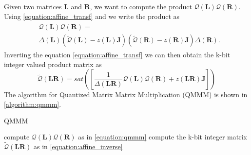  Given two matrices $\mathbf{L}$ and $\mathbf{R}$, we want to compute the product $\mathcal{Q}(\mathbf{L}) \mathcal{Q}(\mathbf{R})$. Using \cref{equation:affine_transf} and we write the product as 
\begin{align}\label{equation:qmmm}
\begin{split}
& \mathcal{Q}(\mathbf{L}) \mathcal{Q}(\mathbf{R}) =\\
 & \Delta (\mathbf{L})\left( \tilde{\mathcal{Q}}(\mathbf{L}) - z(\mathbf{L})\mathbf{J} \right)
\left( \tilde{\mathcal{Q}}(\mathbf{R}) - z(\mathbf{R})\mathbf{J} \right)  \Delta (\mathbf{R}).
\end{split}
\end{align}
Inverting the equation \ref{equation:affine_transf}  we can then obtain the k-bit integer valued product matrix as 
\begin{equation}\label{equation:affine_inverse}
\tilde{\mathcal{Q}}(\mathbf{LR}) = sat([\frac{1}{\Delta(\mathbf{LR})}\mathcal{Q}(\mathbf{L}) \mathcal{Q}(\mathbf{R}) + z(\mathbf{LR}) \mathbf{J}])
\end{equation} The algorithm for Quantized Matrix Matrix Multiplication (QMMM) is shown in \cref{algorithm:qmmm}.

\begin{algorithm}
	\caption{QMMM}\label{algorithm:qmmm}
	\begin{algorithmic}[1]
		\State compute $\mathcal{Q}(\mathbf{L}) \mathcal{Q}(\mathbf{R})$ as in \cref{equation:qmmm}
		\State compute the k-bit integer matrix $\tilde{\mathcal{Q}}(\mathbf{LR})$ as in \cref{equation:affine_inverse}
 	\end{algorithmic}
\end{algorithm}

